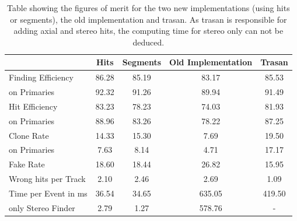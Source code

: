 \begin{table}
  \caption{Table showing the figures of merit for the two new implementations (using hits or segments), the old implementation and trasan. As trasan is responsible for adding axial and stereo hits, the computing time for stereo only can not be deduced.}
  \centering
  \begin{tabular}{lcccc} \toprule
    & Hits & Segments & Old Implementation & Trasan \\ \midrule
    Finding Efficiency & 86.28 & 85.19 & 83.17 & 85.53 \\
    \quad on Primaries & 92.32 & 91.26 & 89.94 & 91.49 \\ 
    Hit Efficiency     & 83.23 & 78.23 & 74.03 & 81.93 \\
    \quad on Primaries & 88.96 & 83.26 & 78.22 & 87.25 \\ 
    Clone Rate         & 14.33 & 15.30 & 7.69  & 19.50 \\
    \quad on Primaries & 7.63  & 8.14  & 4.71  & 17.17 \\ 
    Fake Rate          & 18.60 & 18.44 & 26.82 & 15.95 \\ 
    Wrong hits per Track & 2.10 & 2.46 & 2.69  & 1.09  \\
    Time per Event in ms & 36.54 & 34.65 & 635.05 & 419.50 \\ 
    \quad only Stereo Finder & 2.79 & 1.27 & 578.76 & - \\ \bottomrule
  \end{tabular}
  \label{tab-stereo-results}
\end{table}

